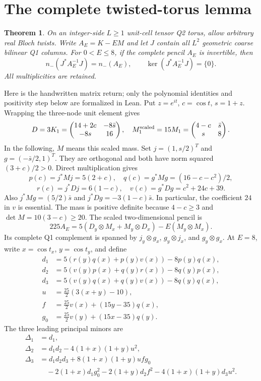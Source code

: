 \documentclass[11pt]{article}
\newtheorem{theorem}{Theorem}
\newcommand{\nminus}{n_{-}}
\begin{document}
\section{The complete twisted-torus lemma}
\begin{theorem}
On an integer-side $L\geq1$ unit-cell tensor Q2 torus, allow arbitrary real Bloch twists. Write $A_E=K-EM$ and let $J$ contain all $L^2$ geometric coarse bilinear Q1 columns. For $0<E\leq8$, if the complete pencil $A_E$ is invertible, then
\[
 \nminus(J^*A_E^{-1}J)=\nminus(A_E),\qquad
 \ker(J^*A_E^{-1}J)=\{0\}.
\]
All multiplicities are retained.
\end{theorem}
Here is the handwritten matrix return; only the polynomial identities and positivity step below are formalized in Lean. Put $z=e^{it}$, $c=\cos t$, $s=1+z$. Wrapping the three-node unit element gives
\[
 D=3K_1=\begin{pmatrix}14+2c&-8\bar s\\-8s&16\end{pmatrix},\quad
 M_1^{\rm scaled}=15M_1=\begin{pmatrix}4-c&\bar s\\s&8\end{pmatrix}.
\]
In the following, $M$ means this scaled mass. Set $j=(1,s/2)^T$ and $g=(-\bar s/2,1)^T$. They are orthogonal and both have norm squared $(3+c)/2>0$. Direct multiplication gives
\[
 p(c)=j^*Mj=5(2+c),\quad q(c)=g^*Mg=(16-c-c^2)/2,
\]
\[
 r(c)=j^*Dj=6(1-c),\quad v(c)=g^*Dg=c^2+24c+39.
\]
Also $j^*Mg=(5/2)\bar s$ and $j^*Dg=-3(1-c)\bar s$. In particular, the coefficient $24$ in $v$ is essential. The mass is positive definite because $4-c\geq3$ and $\det M=10(3-c)\geq20$.
The scaled two-dimensional pencil is
\[
 225A_E=5(D_y\otimes M_x+M_y\otimes D_x)-E(M_y\otimes M_x).
\]
Its complete Q1 complement is spanned by $j_y\otimes g_x$, $g_y\otimes j_x$, and $g_y\otimes g_x$. At $E=8$, write $x=\cos t_x$, $y=\cos t_y$, and define
\begin{align*}
 d_1&=5(r(y)q(x)+p(y)v(x))-8p(y)q(x),\\
 d_2&=5(v(y)p(x)+q(y)r(x))-8q(y)p(x),\\
 d_3&=5(v(y)q(x)+q(y)v(x))-8q(y)q(x),\\
 u&=\tfrac{25}{2}(3(x+y)-10),\\
 f&=\tfrac{25}{2}v(x)+(15y-35)q(x),\\
 g_0&=\tfrac{25}{2}v(y)+(15x-35)q(y).
\end{align*}
The three leading principal minors are
\begin{align*}
 \Delta_1&=d_1,\\
 \Delta_2&=d_1d_2-4(1+x)(1+y)u^2,\\
 \Delta_3&=d_1d_2d_3+8(1+x)(1+y)ufg_0\\
 &\quad-2(1+x)d_1g_0^2-2(1+y)d_2f^2
       -4(1+x)(1+y)d_3u^2.
\end{align*}
\end{document}
